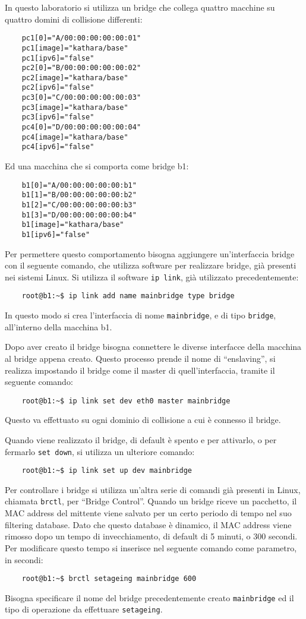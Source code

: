\documentclass{article}
\numberwithin{equation}{subsection}
\begin{document}
In questo laboratorio si utilizza un bridge che collega quattro macchine su quattro domini di collisione differenti: 
\begin{verbatim}
    pc1[0]="A/00:00:00:00:00:01"
    pc1[image]="kathara/base"
    pc1[ipv6]="false"
    pc2[0]="B/00:00:00:00:00:02"
    pc2[image]="kathara/base"
    pc2[ipv6]="false"
    pc3[0]="C/00:00:00:00:00:03"
    pc3[image]="kathara/base"
    pc3[ipv6]="false"
    pc4[0]="D/00:00:00:00:00:04"
    pc4[image]="kathara/base"
    pc4[ipv6]="false"
\end{verbatim}
Ed una macchina che si comporta come bridge b1:
\begin{verbatim}
    b1[0]="A/00:00:00:00:00:b1"
    b1[1]="B/00:00:00:00:00:b2"
    b1[2]="C/00:00:00:00:00:b3"
    b1[3]="D/00:00:00:00:00:b4"
    b1[image]="kathara/base"
    b1[ipv6]="false"
\end{verbatim}
Per permettere questo comportamento bisogna aggiungere un'interfaccia bridge con il seguente comando, che utilizza software per realizzare bridge, già presenti nei 
sistemi Linux. Si utilizza il software \verb|ip link|, già utilizzato precedentemente:
\begin{verbatim}
    root@b1:~$ ip link add name mainbridge type bridge
\end{verbatim}
In questo modo si crea l'interfaccia di nome \verb|mainbridge|, e di tipo \verb|bridge|, all'interno della macchina b1.  

Dopo aver creato il bridge bisogna connettere le diverse interfacce della macchina al bridge appena creato. Questo processo prende il nome di ``enslaving'', si realizza 
impostando il bridge come il master di quell'interfaccia, tramite il seguente comando:
\begin{verbatim}
    root@b1:~$ ip link set dev eth0 master mainbridge
\end{verbatim}
Questo va effettuato su ogni dominio di collisione a cui è connesso il bridge. 

Quando viene realizzato il bridge, di default è spento e per attivarlo, o per fermarlo \verb|set down|, si utilizza un ulteriore comando:
\begin{verbatim}
    root@b1:~$ ip link set up dev mainbridge
\end{verbatim}
Per controllare i bridge si utilizza un'altra serie di comandi già presenti in Linux, chiamata \verb|brctl|, per ``Bridge Control''. Quando un bridge riceve un pacchetto, 
il MAC address del mittente viene salvato per un certo periodo di tempo nel suo filtering database. Dato che questo database è dinamico, il MAC address viene 
rimosso dopo un tempo di invecchiamento, di default di 5 minuti, o 300 secondi. Per modificare questo tempo si inserisce nel seguente comando come parametro, in secondi:
\begin{verbatim}
    root@b1:~$ brctl setageing mainbridge 600  
\end{verbatim}
Bisogna specificare il nome del bridge precedentemente creato \verb|mainbridge| ed il tipo di operazione da effettuare \verb|setageing|. 
\end{document}

